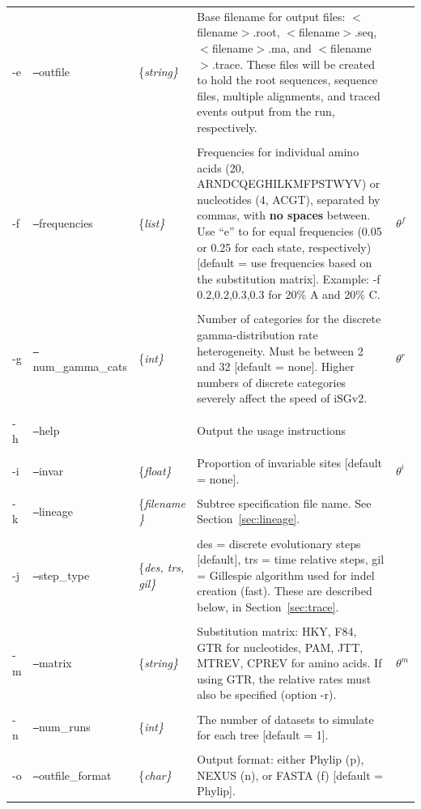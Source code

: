 \documentclass[10pt]{article}
\begin{document}
\begin{ThreePartTable}
\begin{longtable}{p{0.40in}llp{2.75in}p{0.25in}}
\\
 -e & {\tt --}outfile & \{\it string\} & Base filename for output files: $<$filename$>$.root, $<$filename$>$.seq, $<$filename$>$.ma, and $<$filename$>$.trace. These files will be created to hold the root sequences, sequence files, multiple alignments, and traced events output from the run, respectively.\\
\\
 -f & {\tt --}frequencies & \{\it list\} & Frequencies for individual amino acids (20, ARNDCQEGHILKMFPSTWYV) or nucleotides (4, ACGT), separated by commas, with \textbf{no spaces} between. Use ``e'' to for equal frequencies (0.05 or 0.25 for each state, respectively) [default = use frequencies based on the substitution matrix]. Example: -f 0.2,0.2,0.3,0.3 for 20\% A and 20\% C. & $\theta^f$\\
\\
 -g & {\tt --}num\_gamma\_cats & \{\it int\} & Number of categories for the discrete gamma-distribution rate heterogeneity. Must be between 2 and 32 [default = none]. Higher numbers of discrete categories severely affect the speed of iSGv2. & $\theta^r$\\
\\
 -h & {\tt --}help & & Output the usage instructions\\
\\
 -i & {\tt --}invar & \{\it float\} & Proportion of invariable sites [default = none]. & $\theta^i$\\
\\
 -k & {\tt --}lineage & \{\it filename \} & Subtree specification file name. See Section~\ref{sec:lineage}.\\
\\
 -j & {\tt --}step\_type & \{\it des, trs, gil\} & des = discrete evolutionary steps [default], trs = time relative steps, gil = Gillespie algorithm used for indel creation (fast). These are described below, in Section~\ref{sec:trace}.\\
\\
 -m & {\tt --}matrix & \{\it string\} & Substitution matrix: HKY, F84, GTR for nucleotides, PAM, JTT, MTREV, CPREV for amino acids. If using GTR, the relative rates must also be specified (option -r). & $\theta^m$\\
\\
 -n & {\tt --}num\_runs & \{\it int\} & The number of datasets to simulate for each tree [default = 1].\\
\\
 -o & {\tt --}outfile\_format & \{\it char\} & Output format: either Phylip (p), NEXUS (n), or FASTA (f) [default = Phylip]. \\

\end{longtable}
\end{ThreePartTable}
\end{document}

